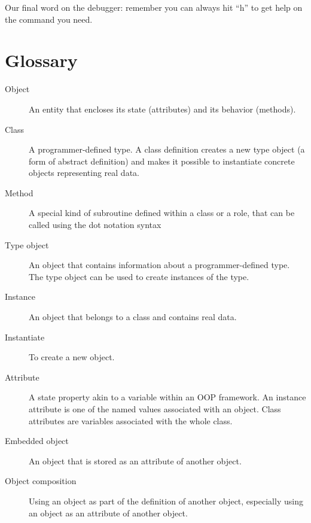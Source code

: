 Our final word on the debugger: remember you can always hit 
``h'' to get help on the command you need. 


\section{Glossary}

\begin{description}

\item[Object] An entity that encloses its state (attributes) 
and its behavior (methods).

\item[Class] A programmer-defined type.  A class definition 
creates a new type object (a form of abstract definition) and 
makes it possible to instantiate concrete objects representing 
real data.

\item[Method] A special kind of subroutine defined within a class or a role, that can be called using the dot notation syntax

\item[Type object] An object that contains information about a
programmer-defined type.  The type object can be used to create instances
of the type.

\item[Instance] An object that belongs to a class and contains 
real data.

\item[Instantiate] To create a new object.

\item[Attribute] A state property akin to a variable within 
an OOP framework. An instance attribute is one of the named 
values associated with an object. Class attributes are variables 
associated with the whole class. 

\item[Embedded object] An object that is stored as an attribute
of another object.

\item[Object composition] Using an object as part of the definition 
of another object, especially using an object as an attribute of 
another object.


\end{description}

